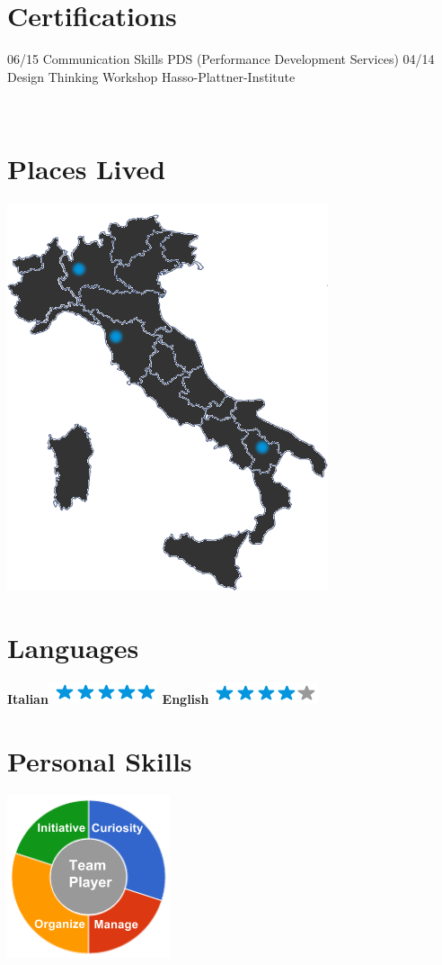 \documentclass[]{friggeri-cv}
\begin{document}
\section{Certifications}
\begin{entrylist}
  \entry
    {06/15}
    {Communication Skills}
    {PDS (Performance Development Services)}
    {\emph{}}
    \entry
    {04/14}
    {Design Thinking Workshop}
    {Hasso-Plattner-Institute}
    {\emph{}}
\end{entrylist}

\newpage

\begin{aside}
~
~
~
  \section{Places Lived}
    \includegraphics[scale=0.25]{img/italia.png}
    ~
  \section{Languages}
    \textbf{Italian}\includegraphics[scale=0.40]{img/5stars.png}
    \textbf{English}\includegraphics[scale=0.40]{img/4stars.png}
    ~
  \section{Personal Skills}
    \includegraphics[scale=0.62]{img/personal.png}
    ~
\end{aside}
\end{document}
